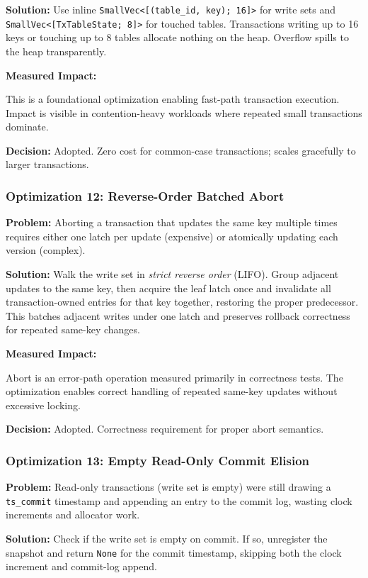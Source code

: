 \documentclass[11pt]{article}
\newcommand{\code}[1]{\texttt{#1}}
\begin{document}
\textbf{Solution:}
Use inline \code{SmallVec<[(table\_id, key); 16]>} for write sets and
\code{SmallVec<[TxTableState; 8]>} for touched tables. Transactions writing up to
16 keys or touching up to 8 tables allocate nothing on the heap. Overflow spills
to the heap transparently.

\textbf{Measured Impact:}

This is a foundational optimization enabling fast-path transaction execution. Impact
is visible in contention-heavy workloads where repeated small transactions dominate.

\textbf{Decision:} Adopted. Zero cost for common-case transactions; scales gracefully
to larger transactions.

\subsubsection{Optimization 12: Reverse-Order Batched Abort}

\textbf{Problem:}
Aborting a transaction that updates the same key multiple times requires either one
latch per update (expensive) or atomically updating each version (complex).

\textbf{Solution:}
Walk the write set in \emph{strict reverse order} (LIFO). Group adjacent updates to
the same key, then acquire the leaf latch once and invalidate all transaction-owned
entries for that key together, restoring the proper predecessor. This batches adjacent
writes under one latch and preserves rollback correctness for repeated same-key changes.

\textbf{Measured Impact:}

Abort is an error-path operation measured primarily in correctness tests. The optimization
enables correct handling of repeated same-key updates without excessive locking.

\textbf{Decision:} Adopted. Correctness requirement for proper abort semantics.

\subsubsection{Optimization 13: Empty Read-Only Commit Elision}

\textbf{Problem:}
Read-only transactions (write set is empty) were still drawing a \code{ts\_commit}
timestamp and appending an entry to the commit log, wasting clock increments and
allocator work.

\textbf{Solution:}
Check if the write set is empty on commit. If so, unregister the snapshot and return
\code{None} for the commit timestamp, skipping both the clock increment and commit-log
append.
\end{document}
